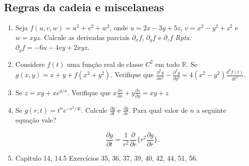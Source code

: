 \documentclass[11pt]{article}
\begin{document}
    \subsection{Regras da cadeia e miscelaneas} 
       \begin{enumerate}
       \item Seja $f(u,v,w)=u^{2}+v^{2}+w^{2}$, 
       onde $u=2x-3y+5z$, $v=x^{2}-y^{2}+z^{2}$ e $w=xyz$. 
       Calcule as derivadas parciais 
       $\partial_{x}f$,  
       $\partial_{y}f$ e
        $\partial_{z}f$ {\it Rpta: }  $\partial_{y}f=-6u-4vy+2xyz$. 
       \item Considere $f(t)$ uma função real de classe $C^{2}$ em todo 
       $\mathbb{R}$. Se $g(x,y)=x+y+f(x^{2}+y^{2})$. 
       Verifique que  $\frac{\partial^{2} g}{\partial x^{2}}-
       \frac{\partial^{2} g}{\partial y^{2}}=4(x^{2}-y^{2})
       \frac{d^{2} f(t)}{d t^{2}}$.
       \item Se $z=xy+xe^{y/x}$. Verifique que 
       $x\frac{\partial z}{\partial x}+
       y\frac{\partial z}{\partial y}=xy+z$
       \item Se $g(r,t)=t^{n}e^{-r^{2}/4t}$.
         Calcule
          $\frac{\partial g}{\partial t}$ e
           $\frac{\partial g}{\partial r}$. 
           Para qual valor de $n$ 
           a seguinte equação vale?
            
       $$\frac{\partial g}{\partial t}=\frac{1}{r^{2}}\frac{\partial }{\partial r}\{r^{2}\frac{\partial g}{\partial r}\}. $$ 
       \item Capitulo 14, 14.5 Exercícios 35, 36, 37, 39, 40, 42, 44, 51, 56.  
       \end{enumerate}
       
       
       
       
       
\end{document}
